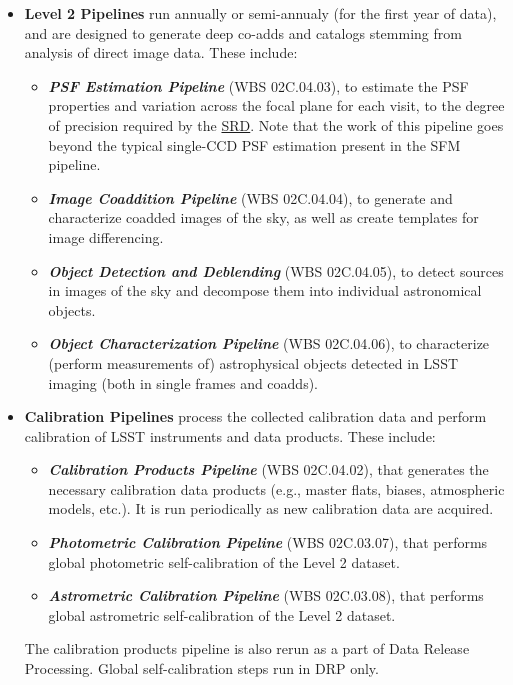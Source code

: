 \documentclass[12pt]{article}
\newcommand{\ds}[2]{{\color{blue} \href{https://docushare.lsstcorp.org/docushare/dsweb/Get/#1}{#2}}\xspace}
\newcommand{\SRD}{\ds{LPM-17}{SRD}}
\newcommand{\wbsPSF}{WBS 02C.04.03}
\newcommand{\wbsCoadd}{WBS 02C.04.04}
\newcommand{\wbsDetDeblend}{WBS 02C.04.05}
\newcommand{\wbsObjChar}{WBS 02C.04.06}
\newcommand{\wbsCPP}{WBS 02C.04.02}
\newcommand{\wbsPhotoCal}{WBS 02C.03.07}
\newcommand{\wbsAstroCal}{WBS 02C.03.08}
\begin{document}
\begin{itemize}
    \item {\bf Level 2 Pipelines} run annually or semi-annualy (for the first year of data), and are designed to generate deep co-adds and catalogs stemming from analysis of direct image data.  These include:
    \begin{itemize}
        \item {\bf \emph{PSF Estimation Pipeline}} (\wbsPSF), to estimate the PSF properties and variation across the focal plane for each visit, to the degree of precision required by the \SRD. Note that the work of this pipeline goes beyond the typical single-CCD PSF estimation present in the SFM pipeline.
        \item {\bf \emph{Image Coaddition Pipeline}} (\wbsCoadd), to generate and characterize coadded images of the sky, as well as create templates for image differencing.
        \item {\bf \emph{Object Detection and Deblending}} (\wbsDetDeblend), to detect sources in images of the sky and decompose them into individual astronomical objects.
        \item {\bf \emph{Object Characterization Pipeline}} (\wbsObjChar), to characterize (perform measurements of) astrophysical objects detected in LSST imaging (both in single frames and coadds).
    \end{itemize}
    
    \item {\bf Calibration Pipelines} process the collected calibration data and perform calibration of LSST instruments and data products. These include:
    \begin{itemize}
        \item {\bf \emph{Calibration Products Pipeline}} (\wbsCPP), that generates the necessary calibration data products (e.g., master flats, biases, atmospheric models, etc.). It is run periodically as new calibration data are acquired.
        \item {\bf \emph{Photometric Calibration Pipeline}} (\wbsPhotoCal), that performs global photometric self-calibration of the Level 2 dataset.
        \item {\bf \emph{Astrometric Calibration Pipeline}} (\wbsAstroCal), that performs global astrometric self-calibration of the Level 2 dataset.
    \end{itemize}
    The calibration products pipeline is also rerun as a part of Data Release Processing. Global self-calibration steps run in DRP only.


\end{itemize}
\end{document}

